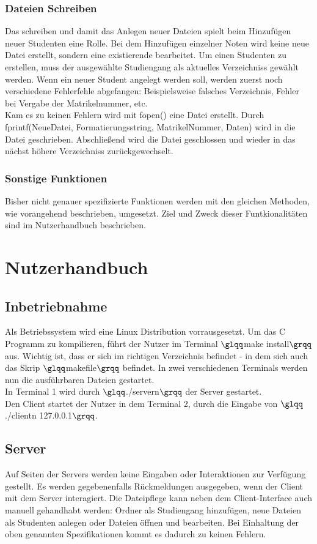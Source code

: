 \documentclass{scrartcl}
\begin{document}
		\subsubsection{Dateien Schreiben}	
			Das schreiben und damit das Anlegen neuer Dateien spielt beim Hinzufügen neuer Studenten eine Rolle. Bei dem Hinzufügen einzelner Noten wird keine neue Datei erstellt, sondern eine existierende bearbeitet. Um einen Studenten zu erstellen, muss der ausgewählte Studiengang als aktuelles Verzeichniss gewählt werden. Wenn ein neuer Student angelegt werden soll, werden zuerst noch verschiedene Fehlerfehle abgefangen: Beispielsweise falsches Verzeichnis, Fehler bei Vergabe der Matrikelnummer, etc. \\
			Kam es zu keinen Fehlern wird mit fopen() eine Datei erstellt. Durch fprintf(NeueDatei, Formatierungsstring, MatrikelNummer, Daten) wird in die Datei geschrieben. Abschließend wird die Datei geschlossen und wieder in das nächst höhere Verzeichniss zurückgewechselt.
		\subsubsection{Sonstige Funktionen}
			Bisher nicht genauer spezifizierte Funktionen werden mit den gleichen Methoden, wie vorangehend beschrieben, umgesetzt. Ziel und Zweck dieser Funtkionalitäten sind im Nutzerhandbuch beschrieben.
\section{Nutzerhandbuch}
	\subsection{Inbetriebnahme}
		Als Betriebssystem wird eine Linux Distribution vorrausgesetzt. Um das C Programm zu kompilieren, führt der Nutzer im Terminal $\glqq$make install$\grqq$ aus. Wichtig ist, dass er sich im richtigen Verzeichnis befindet - in dem sich auch das Skrip $\glqq$makefile$\grqq$ befindet. In zwei verschiedenen Terminals werden nun die ausführbaren Dateien gestartet.\\
		In Terminal 1 wird durch $\glqq$./servern$\grqq$ der Server gestartet.\\
		Den Client startet der Nutzer in dem Terminal 2, durch die Eingabe von $\glqq$./clientn 127.0.0.1$\grqq$.
	\subsection{Server}
		Auf Seiten der Servers werden keine Eingaben oder Interaktionen zur Verfügung gestellt. Es werden gegebenenfalls Rückmeldungen ausgegeben, wenn der Client mit dem Server interagiert. Die Dateipflege kann neben dem Client-Interface auch manuell gehandhabt werden: Ordner als Studiengang hinzufügen, neue Dateien als Studenten anlegen oder Dateien öffnen und bearbeiten. Bei Einhaltung der oben genannten Spezifikationen kommt es dadurch zu keinen Fehlern.
\end{document}
